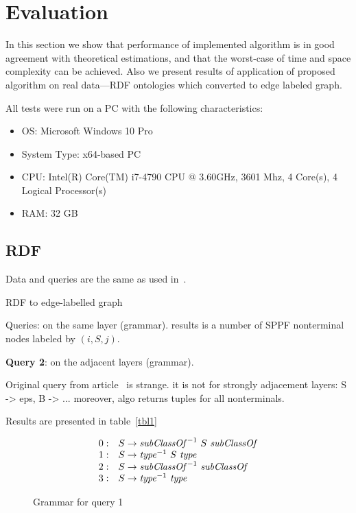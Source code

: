 \section{Evaluation}

In this section we show that performance of implemented algorithm is in good agreement with theoretical estimations, and that the worst-case of time and space complexity can be achieved. Also we present results of application of proposed algorithm on real data---RDF ontologies which converted to edge labeled graph.

All tests were run on a PC with the following characteristics:
\begin{itemize}
\item OS: Microsoft Windows 10 Pro
\item System Type: x64-based PC
\item CPU: Intel(R) Core(TM) i7-4790 CPU @ 3.60GHz, 3601 Mhz, 4 Core(s), 4 Logical Processor(s)
\item RAM: 32 GB
\end{itemize}


\subsection{RDF}

Data and queries are the same as used in~\cite{CFGonRDF}.


RDF to edge-labelled graph

Queries: on the same layer (grammar). results is a number of SPPF nonterminal nodes labeled by $(i,S,j)$.

\textbf{Query 2}: on the adjacent layers (grammar).

Original query from article~\cite{} is strange.
it is not for strongly adjacement layers: S -> eps, B -> ...
moreover, algo returns tuples for all nonterminals.

Results are presented in table~\ref{tbl1}

\begin{figure}[ht]
   \begin{center}
   \[
\begin{array}{rl}
   0: & S \rightarrow \text{\textit{subClassOf}}^{-1} \ S \ \text{\textit{subClassOf}} \\ 
   1: & S \rightarrow \text{\textit{type}}^{-1} \ S \ \text{\textit{type}} \\ 
   2: & S \rightarrow \text{\textit{subClassOf}}^{-1} \ \text{\textit{subClassOf}} \\ 
   3: & S \rightarrow \text{\textit{type}}^{-1} \ \text{\textit{type}} \\ 
\end{array}
\]
   \caption{Grammar for query 1}
   \label{grammarQ1}        
   \end{center}
\end{figure}

